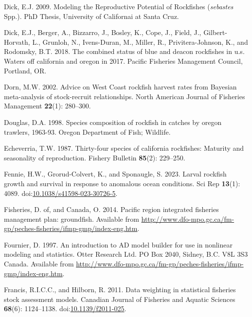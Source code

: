 \documentclass[11pt,
  english,
  letterpaper,
]{article}
\newlength{\cslhangindent}
\newenvironment{CSLReferences}[2] %
 {%
  \setlength{\parindent}{0pt}
  \ifodd #1 \everypar{\setlength{\hangindent}{\cslhangindent}}\ignorespaces\fi
  \ifnum #2 > 0
  \setlength{\parskip}{#2\baselineskip}
  \fi
 }%
 {}
\begin{document}
\begin{CSLReferences}{1}{0}
\leavevmode{}%
Dick, E.J. 2009. Modeling the {Reproductive} {Potential} of {Rockfishes} (\emph{sebastes} {Spp}.). PhD Thesis, University of Californai at Santa Cruz.

\leavevmode{}%
Dick, E.J., Berger, A., Bizzarro, J., Bosley, K., Cope, J., Field, J., Gilbert-Horvath, L., Grunloh, N., Ivens-Duran, M., Miller, R., Privitera-Johnson, K., and Rodomsky, B.T. 2018. The combined status of blue and deacon rockfishes in u.s. Waters off california and oregon in 2017. Pacific Fisheries Management Council, Portland, {OR}.

\leavevmode{}%
Dorn, M.W. 2002. Advice on {West} {Coast} rockfish harvest rates from {B}ayesian meta-analysis of stock-recruit relationships. North American Journal of Fisheries Management \textbf{22}(1): 280--300.

\leavevmode{}%
Douglas, D.A. 1998. Species composition of rockfish in catches by oregon trawlers, 1963-93. Oregon Department of Fish; Wildlife.

\leavevmode{}%
Echeverria, T.W. 1987. Thirty-four species of california rockfishes: Maturity and seasonality of reproduction. Fishery Bulletin \textbf{85}(2): 229--250.

\leavevmode{}%
Fennie, H.W., Grorud-Colvert, K., and Sponaugle, S. 2023. Larval rockfish growth and survival in response to anomalous ocean conditions. Sci Rep \textbf{13}(1): 4089. doi:\href{https://doi.org/10.1038/s41598-023-30726-5}{10.1038/s41598-023-30726-5}.

\leavevmode{}%
Fisheries, D. of, and Canada, O. 2014. Pacific region integrated fisheries management plan: groundfish. Available from \url{http://www.dfo-mpo.gc.ca/fm-gp/peches-fisheries/ifmp-gmp/index-eng.htm}.

\leavevmode{}%
Fournier, D. 1997. An introduction to AD model builder for use in nonlinear modeling and statistics. Otter Research Ltd. PO Box 2040, Sidney, B.C. V8L 3S3 Canada. Available from \url{http://www.dfo-mpo.gc.ca/fm-gp/peches-fisheries/ifmp-gmp/index-eng.htm}.

\leavevmode{}%
Francis, R.I.C.C., and Hilborn, R. 2011. Data weighting in statistical fisheries stock assessment models. Canadian Journal of Fisheries and Aquatic Sciences \textbf{68}(6): 1124--1138. doi:\href{https://doi.org/10.1139/f2011-025}{10.1139/f2011-025}.


\end{CSLReferences}
\end{document}
